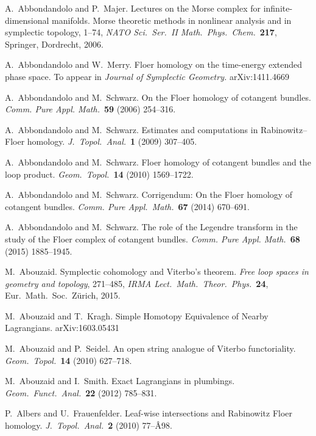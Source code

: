 \documentclass[12pt,twoside]{amsart}
\theoremstyle{plain}
\numberwithin{figure}{section}
\numberwithin{equation}{section}
\begin{document}
\begin{thebibliography}{999}

A.~Abbondandolo and P.~Majer. 
Lectures on the Morse complex for
infinite-dimensional manifolds. Morse theoretic methods in nonlinear
analysis and in symplectic topology, 1--74, {\it NATO Sci.\ Ser.\ II
Math.\ Phys.\ Chem.}~{\bf 217}, Springer, Dordrecht, 2006.


A.~Abbondandolo and W.~Merry. 
Floer homology on the time-energy extended phase space.
To appear in {\it Journal of Symplectic Geometry.}
arXiv:1411.4669 

A.\ Abbondandolo and M.\ Schwarz.
On the Floer homology of cotangent bundles.
{\it Comm. Pure Appl. Math.}~{\bf 59} (2006) 254--316.

A.\ Abbondandolo and M.\ Schwarz.
Estimates and computations in Rabinowitz--Floer homology. 
{\it J.~Topol.\ Anal.}~{\bf 1} (2009) 307--405. 

A.\ Abbondandolo and M.\ Schwarz.
Floer homology of cotangent bundles and the loop product. 
{\it Geom.\ Topol.}~{\bf 14} (2010) 1569--1722.

A.\ Abbondandolo and M.\ Schwarz.
Corrigendum: On the Floer homology of cotangent bundles. 
{\it Comm. Pure Appl.\ Math.}~{\bf 67} (2014) 670--691.

A.\ Abbondandolo and M.\ Schwarz.
The role of the Legendre transform in the study of the Floer complex of cotangent bundles.
{\it Comm. Pure Appl. Math.}~{\bf 68} (2015) 1885--1945.

M.\ Abouzaid.
Symplectic cohomology and Viterbo's theorem. 
{\it Free loop spaces in geometry and topology}, 271--485, 
{\it IRMA Lect.\ Math.\ Theor.\ Phys.}~{\bf 24}, Eur.\ Math.\ Soc.\, Z\"urich, 2015.

M.\ Abouzaid and T.\ Kragh. 
Simple Homotopy Equivalence of Nearby Lagrangians.
arXiv:1603.05431

M.\ Abouzaid and P.\ Seidel.
An open string analogue of Viterbo functoriality. 
{\it Geom.\ Topol.}~{\bf 14} (2010) 627--718. 

M.\ Abouzaid and I.\ Smith.
Exact Lagrangians in plumbings. 
{\it Geom.\ Funct.\ Anal.}~{\bf 22} (2012) 785--831.

P.~Albers and U.~Frauenfelder.
Leaf-wise intersections and Rabinowitz Floer homology.
{\it J.\ Topol.\ Anal.}~{\bf 2} (2010) 77--Â98.


\end{thebibliography}
\end{document}
